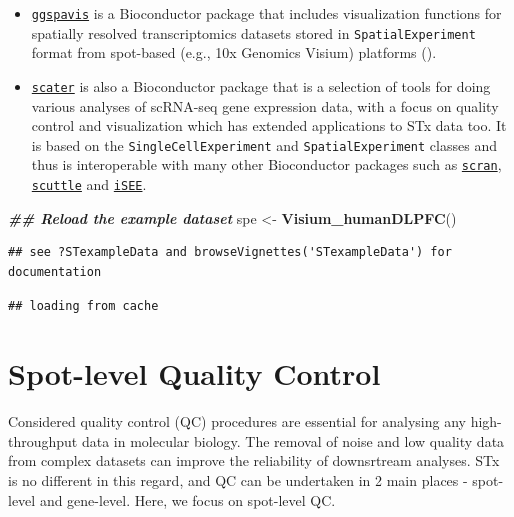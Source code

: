 \documentclass[
]{book}
\newenvironment{Shaded}{\begin{snugshade}}{\end{snugshade}}
\newcommand{\DocumentationTok}[1]{\textcolor[rgb]{0.56,0.35,0.01}{\textbf{\textit{#1}}}}
\newcommand{\FunctionTok}[1]{\textcolor[rgb]{0.13,0.29,0.53}{\textbf{#1}}}
\newcommand{\NormalTok}[1]{#1}
\newcommand{\OtherTok}[1]{\textcolor[rgb]{0.56,0.35,0.01}{#1}}
\begin{document}
\begin{itemize}
\item
  \href{https://bioconductor.org/packages/release/bioc/html/ggspavis.html}{\texttt{ggspavis}} is a Bioconductor package that includes visualization functions for spatially resolved transcriptomics datasets stored in \texttt{SpatialExperiment} format from spot-based (e.g., 10x Genomics Visium) platforms (\citet{ggspavis2023Apr}).
\item
  \href{https://bioconductor.org/packages/release/bioc/html/scater.html}{\texttt{scater}} is also a Bioconductor package that is a selection of tools for doing various analyses of scRNA-seq gene expression data, with a focus on quality control and visualization which has extended applications to STx data too. It is based on the \texttt{SingleCellExperiment} and \texttt{SpatialExperiment} classes and thus is interoperable with many other Bioconductor packages such as \href{Spot-level\%20quality\%20control\%20(sQC)\%20procedures\%20are\%20employed\%20to\%20eliminate\%20low-quality\%20spots\%20before\%20conducting\%20further\%20analyses}{\texttt{scran}}, \href{https://bioconductor.org/packages/release/scuttle}{\texttt{scuttle}} and \href{https://bioconductor.org/packages/release/iSEE}{\texttt{iSEE}}.
\end{itemize}

\begin{Shaded}
\begin{Highlighting}[]
\DocumentationTok{\#\# Reload the example dataset}
\NormalTok{spe }\OtherTok{\textless{}{-}} \FunctionTok{Visium\_humanDLPFC}\NormalTok{()}
\end{Highlighting}
\end{Shaded}

\begin{verbatim}
## see ?STexampleData and browseVignettes('STexampleData') for documentation
\end{verbatim}

\begin{verbatim}
## loading from cache
\end{verbatim}

\hypertarget{spot-level-quality-control}{%
\section{Spot-level Quality Control}\label{spot-level-quality-control}}

Considered quality control (QC) procedures are essential for analysing any high-throughput data in molecular biology. The removal of noise and low quality data from complex datasets can improve the reliability of downsrtream analyses. STx is no different in this regard, and QC can be undertaken in 2 main places - spot-level and gene-level. Here, we focus on spot-level QC.
\end{document}
